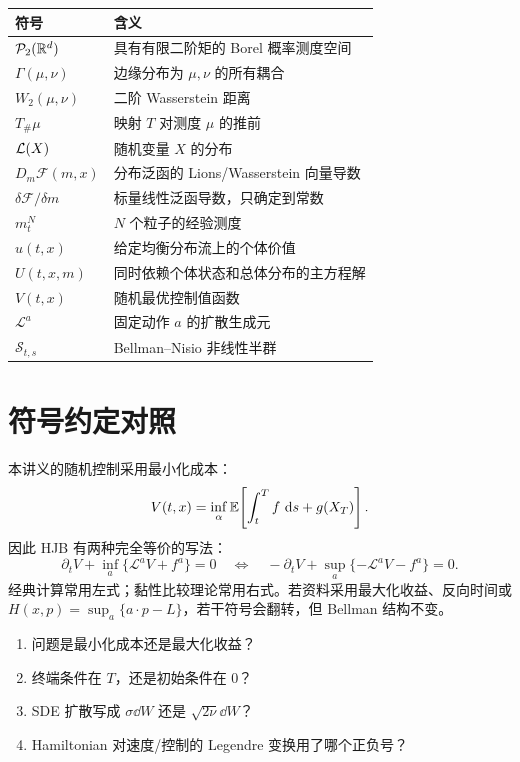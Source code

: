 \begin{tcolorbox}[colback=NightPanelTwo,colframe=GridLine]
\begin{tabularx}{\textwidth}{@{}>{\color{YellowAccent}}p{}Y@{}}
\toprule
\textcolor{BlueAccent}{符号} & \textcolor{BlueAccent}{含义} \\
\midrule
$\mathcal{P}_2(\mathbb{R}^d)$ & 具有有限二阶矩的 Borel 概率测度空间 \\
$\Gamma(\mu,\nu)$ & 边缘分布为 $\mu,\nu$ 的所有耦合 \\
$W_2(\mu,\nu)$ & 二阶 Wasserstein 距离 \\
$T_\#\mu$ & 映射 $T$ 对测度 $\mu$ 的推前 \\
$\mathcal{L}(X)$ & 随机变量 $X$ 的分布 \\
$D_m\mathcal F(m,x)$ & 分布泛函的 Lions/Wasserstein 向量导数 \\
$\delta\mathcal F/\delta m$ & 标量线性泛函导数，只确定到常数 \\
$m_t^N$ & $N$ 个粒子的经验测度 \\
$u(t,x)$ & 给定均衡分布流上的个体价值 \\
$U(t,x,m)$ & 同时依赖个体状态和总体分布的主方程解 \\
$V(t,x)$ & 随机最优控制值函数 \\
$\mathcal L^a$ & 固定动作 $a$ 的扩散生成元 \\
$\mathcal S_{t,s}$ & Bellman--Nisio 非线性半群 \\
\bottomrule
\end{tabularx}
\end{tcolorbox}

\section{符号约定对照}

本讲义的随机控制采用最小化成本：
\[
V(t,x)=\inf_\alpha\mathbb{E}\!\left[\int_t^Tf\,\,\mathrm{d} s+g(X_T)\right].
\]
因此 HJB 有两种完全等价的写法：
\[
\partial_tV+\inf_a\{\mathcal L^aV+f^a\}=0
\quad\Longleftrightarrow\quad
-\partial_tV+\sup_a\{-\mathcal L^aV-f^a\}=0.
\]
经典计算常用左式；黏性比较理论常用右式。若资料采用最大化收益、反向时间或 $H(x,p)=\sup_a\{a\cdot p-L\}$，若干符号会翻转，但 Bellman 结构不变。

\begin{pitfall}[核对公式的四步]
\begin{enumerate}
  \item 问题是最小化成本还是最大化收益？
  \item 终端条件在 $T$，还是初始条件在 $0$？
  \item SDE 扩散写成 $\sigma\dd W$ 还是 $\sqrt{2\nu}\dd W$？
  \item Hamiltonian 对速度/控制的 Legendre 变换用了哪个正负号？
\end{enumerate}
\end{pitfall}


